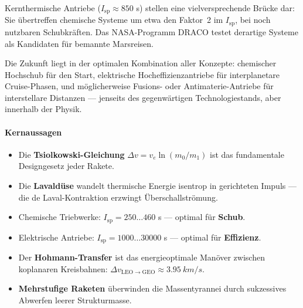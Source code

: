 ﻿\documentclass[12pt,a4paper]{article}
\newcommand{\Isp}{I_{\mathrm{sp}}}
\newcommand{\Dv}{\Delta v}
\begin{document}
Kernthermische Antriebe ($\Isp \approx 850$ s) stellen eine vielversprechende Brücke dar:
Sie übertreffen chemische Systeme um etwa den Faktor~2 im $\Isp$, bei noch nutzbaren
Schubkräften. Das NASA-Programm DRACO testet derartige Systeme als Kandidaten für
bemannte Marsreisen.

Die Zukunft liegt in der optimalen Kombination aller Konzepte: chemischer Hochschub
für den Start, elektrische Hocheffizienzantriebe für interplanetare Cruise-Phasen,
und möglicherweise Fusions- oder Antimaterie-Antriebe für interstellare Distanzen ---
jenseits des gegenwärtigen Technologiestands, aber innerhalb der Physik.

\bigskip
\paragraph*{Kernaussagen}
\begin{itemize}[leftmargin=*]
  \item Die \textbf{Tsiolkowski-Gleichung} $\Dv = v_e\ln(m_0/m_1)$ ist das
    fundamentale Designgesetz jeder Rakete.
  \item Die \textbf{Lavaldüse} wandelt thermische Energie isentrop in gerichteten
    Impuls --- die de Laval-Kontraktion erzwingt Überschallströmung.
  \item Chemische Triebwerke: $\Isp = 250\ldots460$ s --- optimal für \textbf{Schub}.
  \item Elektrische Antriebe: $\Isp = 1000\ldots30000$ s --- optimal für \textbf{Effizienz}.
  \item Der \textbf{Hohmann-Transfer} ist das energieoptimale Manöver zwischen
    koplanaren Kreisbahnen: $\Dv_{\mathrm{LEO\to GEO}} \approx \SI{3.95}{km/s}$.
  \item \textbf{Mehrstufige Raketen} überwinden die Massentyrannei durch sukzessives
    Abwerfen leerer Strukturmasse.
\end{itemize}
\end{document}
